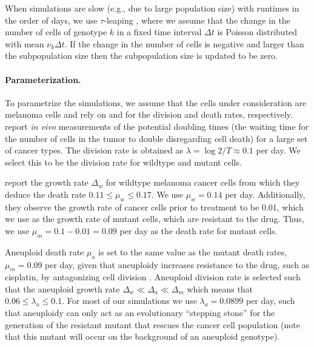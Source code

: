 \documentclass[12pt]{extarticle}
\begin{document}
When simulations are slow (e.g., due to large population size) with runtimes in the order of days, we use $\tau$-leaping \citep{gillespie2001approximate}, where we assume that the change in the number of cells of genotype $k$ in a fixed time interval $\Delta t$ is Poisson distributed with mean $\nu_k \Delta t$. If the change in the number of cells is negative and larger than the subpopulation size then the subpopulation size is updated to be zero. 



\paragraph{Parameterization.}
To parametrize the simulations, we assume that the cells under consideration are melanoma cells and rely on \citet{rew2000cell} and \citet{bozic2013evolutionary} for the division and death rates, respectively. 
\citet{rew2000cell} report \emph{in vivo} measurements of the potential doubling times (the waiting time for the number of cells in the tumor to double disregarding cell death) for a large set of cancer types. The division rate is obtained as $\lambda=\log{2} / T \approx 0.1$ per day. We select this to be the division rate for wildtype and mutant cells. %

\citet{bozic2013evolutionary} report the growth rate $\Delta_w$ for wildtype melanoma cancer cells from which they deduce the death rate $0.11 \le \mu_w \le 0.17$. We use  $\mu_w=0.14$ per day. Additionally, they observe the growth rate of cancer cells prior to treatment to be 0.01, which we use as the growth rate of mutant cells, which are resistant to the drug. Thus, we use $\mu_m=0.1-0.01=0.09$ per day as the death rate for mutant cells.

Aneuploid death rate $\mu_a$ is set to the same value as the mutant death rates, $\mu_m=0.09$ per day, given that aneuploidy increases resistance to the drug, such as cisplatin, by antagonizing cell division \citep{replogle2020aneuploidy}.
Aneuploid division rate is selected such that the aneuploid growth rate $\Delta_w\ll\Delta_a\ll\Delta_m$ which means that $0.06 \le \lambda_a \le 0.1$. 
For most of our simulations we use $\lambda_a=0.0899$ per day, such that aneuploidy can only act as an evolutionary ``stepping stone'' for the generation of the resistant mutant that rescues the cancer cell population (note that this mutant will occur on the background of an aneuploid genotype).
\end{document}
